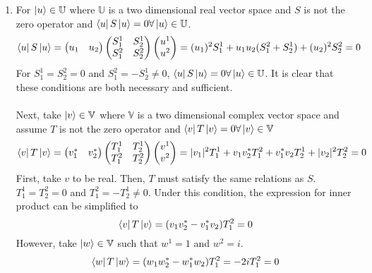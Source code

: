 \begin{sol}
\begin{enumerate}[label=\textbf{(\alph*)}]
\item
For $\ket{u}\in\mathbb U$ where $\mathbb U$ is a two dimensional real vector space and $S$ is not the zero operator and $\bra uS\ket u=0\forall \ket u\in\mathbb U$.
\begin{equation}
	\bra uS\ket u=\begin{pmatrix}u_1&u_2\end{pmatrix}\begin{pmatrix}S_1^1&S_2^1\\S_1^2&S_2^2\end{pmatrix}\begin{pmatrix}u^1\\u^2\end{pmatrix}=(u_1)^2S_1^1+u_1u_2(S_1^2+S_2^1)+(u_2)^2S_2^2=0
\end{equation}  
For $S_1^1=S_2^2=0$ and $S_1^2=-S_2^1\neq 0$, $\bra u S\ket u=0\forall \ket u\in\mathbb U$. It is clear that these conditions are both necessary and sufficient. \\\\
Next, take $\ket v\in\mathbb V$ where $\mathbb V$ is a two dimensional complex vector space and assume $T$ is not the zero operator and $\bra vT\ket v=0\forall\ket v\in \mathbb V$
\begin{equation}
	\bra vT\ket v=\begin{pmatrix}v_1^*&v_2^*\end{pmatrix}\begin{pmatrix}T_1^1&T_2^1\\T_1^2&T_2^2\end{pmatrix}\begin{pmatrix}v^1\\v^2\end{pmatrix}=|v_1|^2T_1^1+v_1v_2^*T_1^2+v_1^*v_2T_2^1+|v_2|^2T_2^2=0
\end{equation}
First, take $v$ to be real. Then, $T$ must satisfy the same relations as $S$.  $T_1^1=T_2^2=0$ and $T_1^2=-T_2^1\neq 0$. Under this condition, the expression for inner product can be simplified to
\begin{equation}
	\bra v T\ket v=(v_1v_2^*-v_1^*v_2)T_1^2=0
\end{equation}However, take $\ket w\in\mathbb V$ such that $w^1=1$ and $w^2=i$.
\begin{equation}
	\bra wT\ket w=(w_1w_2^*-w_1^*w_2)T_1^2=-2iT_1^2=0
\end{equation}

\end{enumerate}
\end{sol}
